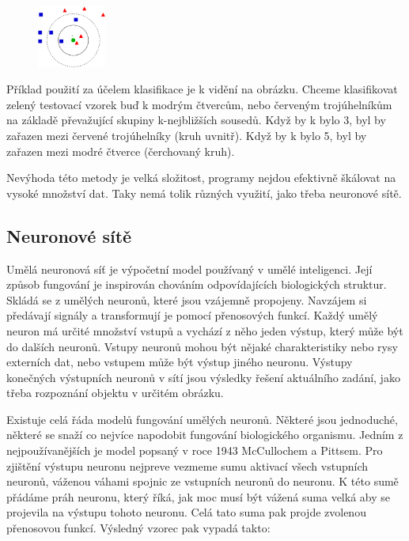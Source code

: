 \documentclass[a4paper,11pt, oneside]{book} \usepackage[czech]{babel}
\begin{document}
	\begin{figure} %
		\centering
		\includegraphics[width=0.2\textwidth]{img/knn-classification.png}
		\label{fig:knn-classification}
	\end{figure}

	Příklad použití za účelem klasifikace je k vidění na obrázku. Chceme klasifikovat
	zelený testovací vzorek buď k modrým čtvercům, nebo červeným trojúhelníkům na základě
	převažující skupiny k-nejbližších sousedů. Když by k bylo 3, byl by zařazen mezi
	červené trojúhelníky (kruh uvnitř). Když by k bylo 5, byl by zařazen mezi modré čtverce
	(čerchovaný kruh).

	Nevýhoda této metody je velká složitost, programy nejdou efektivně škálovat na vysoké množství dat.
	Taky nemá tolik různých využití, jako třeba neuronové sítě.

	\subsection{Neuronové sítě}

	Umělá neuronová síť je výpočetní model používaný v umělé inteligenci. Její způsob
	fungování je inspirován chováním odpovídajících biologických struktur. Skládá
	se z umělých neuronů, které jsou vzájemně propojeny. Navzájem si předávají signály a
	transformují je pomocí přenosových funkcí. Každý umělý neuron má určité množství vstupů
	a vychází z něho jeden výstup, který může být  do dalších neuronů.
	Vstupy neuronů mohou být nějaké charakteristiky nebo rysy externích dat, nebo
	vstupem může být výstup jiného neuronu. Výstupy konečných výstupních neuronů v sítí
	jsou výsledky řešení aktuálního zadání, jako třeba rozpoznání objektu v určitém obrázku.


	Existuje celá řáda modelů fungování umělých neuronů. Některé jsou jednoduché, některé
	se snaží co nejvíce napodobit fungování biologického organismu.
	Jedním z nejpoužívanějších je model popsaný v roce 1943 McCullochem a Pittsem.
	Pro zjištění výstupu neuronu nejpreve vezmeme sumu aktivací všech
	vstupních neuronů, váženou váhami spojnic ze vstupních neuronů do neuronu.
	K této sumě přádáme práh neuronu, který říká, jak moc musí být vážená suma
	velká aby se projevila na výstupu tohoto neuronu. Celá tato suma pak projde zvolenou
	přenosovou funkcí. Výsledný vzorec pak vypadá takto:
\end{document}
